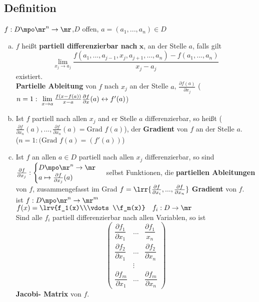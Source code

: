 \subsection{Definition}
	$ f:D\mpo\mr^n\rightarrow\mr $,$ D $ offen, $ a=(a_1,...,a_n)\in D $
	\begin{enumerate}[a)]
		\item $ f $ heißt \textbf{partiell differenzierbar nach }$ \mathbf{x} $, an der Stelle $ a $, falls gilt
		\[ \lim\limits_{x_j\rightarrow a_j}\dfrac{f(a_1,...,a_{j-1},x_j,a_{j+1},...,a_n)-f(a_1,...,a_n)}{x_j-a_j} \]
		existiert.\\
		\textbf{Partielle Ableitung} von $ f $ nach $ x_j $ an der Stelle $ a $, $ \frac{\partial f(a)}{\partial x_j} $ ($ n=1:\ \lim\limits_{x\rightarrow a}\frac{f(x-f(a))}{x-a}\\
		\frac{\partial f}{\partial x}(a)\leftrightarrow f'(a)$)
		
		\item  Ist $ f $ partiell nach allen $ x_j $ and er Stelle $ a $ differenzierbar, so heißt ($ \frac{\partial f}{\partial x_n}(a),...,\frac{\partial f}{\partial x_n}(a)=\mbox{Grad }f(a) $), der \textbf{Gradient} von $ f $ an der Stelle $ a $.\\
		($ n=1:(\mbox{Grad }f(a)=(f'(a)) $)
		
		\item  Ist $ f $ an allen $ a\in D $ partiell nach allen $ x_j $ differenzierbar, so sind $ \frac{\partial f}{\partial x_j}:\begin{cases}D\mpo\mr^n\rightarrow\mr\\ a\mapsto\frac{\partial f}{\partial x_j}(a)\end{cases} $ selbst Funktionen, die \textbf{partiellen Ableitungen} von $ f $, zusammengefasst im Grad $ f=\lrr{\frac{\partial f}{\partial x_i},...,\frac{\partial f}{\partial x_n}} $ \textbf{Gradient} von $ f $.\\
		ist $ f:D\mpo\mr^n\rightarrow\mr^m $ $ f(x)=\lrv{f_1(x)\\\vdots\\f_m(x)}\quad f_i:D\rightarrow\mr $\\
		Sind alle $ f_i $ partiell differenzierbar nach allen Variablen, so ist
		\[
		\begin{pmatrix}
		\dfrac{\partial f_1}{\partial x_1}&...&\dfrac{\partial f_1}{x_n}\\
		\dfrac{\partial f_2}{\partial x_1}&...&\dfrac{\partial f_2}{\partial x_n}\\
		&\vdots&\\
		\dfrac{\partial f_m}{\partial x_1}&...&\dfrac{\partial f_m}{\partial x_n}
		\end{pmatrix}
		\]
		\textbf{Jacobi- Matrix} von $ f $.
	\end{enumerate}

